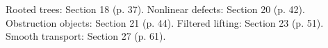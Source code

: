 {\small Rooted trees: Section 18 (p. 37). Nonlinear defects: Section 20 (p. 42). Obstruction objects: Section 21 (p. 44). Filtered lifting: Section 23 (p. 51). Smooth transport: Section 27 (p. 61).\par}
